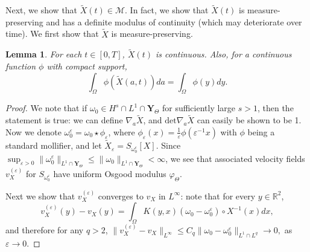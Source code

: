 \documentclass[12pt]{article}
\newtheorem{lemma}{Lemma}
\begin{document}
Next, we show that $\tilde{X}(t) \in \mathcal{M}$. In fact, we show that $\tilde{X}(t)$ is measure-preserving and has a definite modulus of continuity (which may deteriorate over time). We first show that $\tilde{X}$ is measure-preserving.
\begin{lemma} \label{volpres}
For each $t \in [0, T]$, $\tilde{X}(t)$ is continuous. Also, for a continuous function $\phi$ with compact support, 
\begin{equation}
\int_{\Omega} \phi(\tilde{X} (a,t) ) da = \int_{\Omega} \phi(y) dy.
\end{equation}
\end{lemma}
\begin{proof}
We note that if $\omega_0 \in H^s \cap L^1 \cap \mathbf{Y}_{\Theta}$ for sufficiently large $s>1$, then the statement is true: we can define $\nabla_a \tilde{X}$, and $\mathrm{det} \nabla_a \tilde{X}$ can easily be shown to be 1. Now we denote $\omega_0 ^\varepsilon = \omega_0 \star \phi_\varepsilon$, where $\phi_\varepsilon (x) = \frac{1}{\varepsilon} \phi (\varepsilon^{-1} x )$ with $\phi$ being a standard mollifier, and let $\tilde{X}_\varepsilon = S_{\omega_0^\varepsilon} [X].$ Since $\sup_{\varepsilon>0} \| \omega_0 ^\varepsilon \|_{L^1 \cap \mathbf{Y}_{\Theta} } \le \| \omega_0  \|_{L^1 \cap \mathbf{Y}_{\Theta} }< \infty$, we see that associated velocity fields $v_X ^{(\varepsilon)}$ for $S_{\omega_0 ^\varepsilon}$ have uniform Osgood modulus $\varphi_{\Theta}$. 

Next we show that $v_X ^{(\varepsilon)}$ converges to $v_X$ in $L^\infty$: note that for every $y \in \mathbb{R}^2$,
\begin{equation*}
v_X ^{(\varepsilon)} (y) - v_X (y) = \int_{\Omega} K(y,x) (\omega_0 - \omega_0 ^\varepsilon ) \circ X^{-1} (x) dx,
\end{equation*}
and therefore for any $q>2$, $\| v_X^{(\varepsilon)} - v_X \|_{L^\infty} \le  C_q \| \omega_0 - \omega_0 ^\varepsilon \|_{L^1 \cap L^q} \rightarrow 0,$ as $\varepsilon \rightarrow 0$.


\end{proof}
\end{document}
